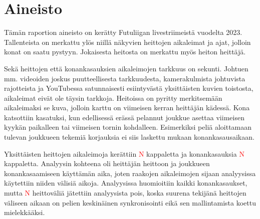 \section{Aineisto}
    Tämän raportion aineisto on kerätty Futuliigan livestriimeistä vuodelta 2023.
    Tallenteista on merkattu ylös niillä näkyvien heittojen aikaleimat ja ajat, jolloin konat on saatu pystyyn.
    Jokaisesta heitosta on merkattu myös heiton heittäjä.

    Sekä heittojen että konankasauksien aikaleimojen tarkkuus on sekunti.
    Johtuen mm. videoiden joskus puutteellisesta tarkkuudesta, kamerakulmista johtuvista rajotteista ja YouTubessa satunnaisesti esiintyvästä yksittäisten kuvien toistosta, aikaleimat eivät ole täysin tarkkoja.
    Heitoissa on pyritty merkitsemään aikaleimaksi se kuva, jolloin karttu on viimeisen kerran heittäjän kädessä.
    Kona katsottiin kasatuksi, kun edellisessä erässä pelannut joukkue asettaa viimeisen kyykän paikalleen tai viimeisen tornin kohdalleen.
    Esimerkiksi peliä aloittamaan tulevan joukkueen tekemiä korjauksia ei siis laskettu mukaan konankasausaikaan.

    Yksittäisten heittojen aikaleimoja kerättiin \textcolor{red}{N} kappaletta ja konankasauksia \textcolor{red}{N} kappaletta.
    Analyysin kohteena oli heittäjän heittoon ja joukkueen konankasaamiseen käyttämän aika, joten raakojen aikaleimojen sijaan analyysissa käytettiin niiden välisiä aikoja.
    Analyysissa huomioitiin kaikki konankasaukset, mutta \textcolor{red}{N} heittoväliä jätettiin analyysista pois,
    koska suurena tekijänä heittojen väliseen aikaan on pelien keskinäinen synkronisointi eikä sen mallintamista koettu mielekkääksi.